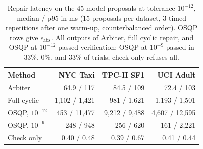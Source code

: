 \begin{table}[t]
\centering
\caption{Repair latency on the 45 model proposals at tolerance $10^{-12}$, median / p95 in ms (15 proposals per dataset, 3 timed repetitions after one warm-up, counterbalanced order). OSQP rows give $\epsilon_{\mathrm{abs}}$. All outputs of Arbiter, full cyclic repair, and OSQP at $10^{-12}$ passed verification; OSQP at $10^{-9}$ passed in 33\%, 0\%, and 33\% of trials; check only refuses all.}
\label{tab:heavy}
\footnotesize
\setlength{\tabcolsep}{3.5pt}
\begin{tabular}{@{}lrrr@{}}
\toprule
Method & NYC Taxi & TPC-H SF1 & UCI Adult \\
\midrule
Arbiter & 64.9 / 117 & 84.5 / 109 & 72.4 / 103 \\
Full cyclic & 1{,}102 / 1{,}421 & 981 / 1{,}621 & 1{,}193 / 1{,}501 \\
OSQP, $10^{-12}$ & 453 / 11{,}477 & 9{,}212 / 9{,}488 & 4{,}607 / 12{,}595 \\
OSQP, $10^{-9}$ & 248 / 948 & 256 / 620 & 161 / 2{,}221 \\
Check only & 0.40 / 0.48 & 0.39 / 0.67 & 0.41 / 0.44 \\
\bottomrule
\end{tabular}
\end{table}
